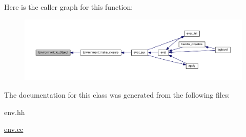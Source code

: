 Here is the caller graph for this function\-:\nopagebreak
\begin{figure}[H]
\begin{center}
\leavevmode
\includegraphics[width=350pt]{classEnvironment_ace71e43a313cdeefb1e445ecef61825b_icgraph}
\end{center}
\end{figure}




The documentation for this class was generated from the following files\-:\begin{DoxyCompactItemize}
\item 
env.\-hh\item 
\hyperlink{env_8cc}{env.\-cc}\end{DoxyCompactItemize}
